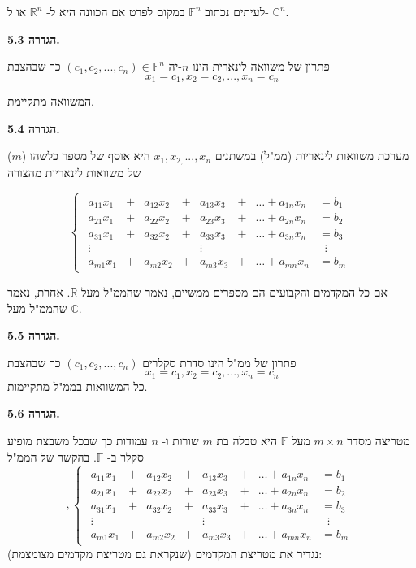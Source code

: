 \documentclass[12pt]{report}
\theoremstyle{plain}
\theoremstyle{definition}
\newcommand{\R}{\mathbb{R}}
\newcommand{\C}{\mathbb{C}}
\newcommand{\F}{\mathbb{F}}
\newcommand{\0}{\mathbf{0}}
\begin{document}
לעיתים נכתוב
$\F^n$
במקום לפרט אם הכוונה היא ל-
$\R^n$
או ל-
$\C^n$.
\bigskip
\bigskip

\noindent\textbf{הגדרה 5.3.}

פתרון של משוואה לינארית הינו $n$-יה $(c_1,c_2,...,c_n)\in\F^{n}$
כך שבהצבת
$$
x_1=c_1,x_2=c_2,...,x_n=c_n
$$

המשוואה מתקיימת.
\bigskip
\bigskip

\noindent\textbf{הגדרה 5.4.}

מערכת משוואות לינאריות (ממ"ל) במשתנים
$x_1,x_{2,}...,x_n$
היא אוסף של מספר כלשהו ($m$) של משוואות לינאריות מהצורה

\begin{equation*}
\begin{cases}
\begin{alignedat}{7}
a_{11}x_1 &{}+{}& a_{12}x_2 &{}+{}& a_{13}x_3 &{}+{}& \dots + a_{1n}x_n &= b_1 \\[4pt]
a_{21}x_1 &{}+{}& a_{22}x_2 &{}+{}& a_{23}x_3 &{}+{}& \dots + a_{2n}x_n &= b_2 \\[4pt]
a_{31}x_1 &{}+{}& a_{32}x_2 &{}+{}& a_{33}x_3 &{}+{}& \dots + a_{3n}x_n &= b_3 \\[4pt]
\vdots& & & & \vdots & & & \;\;\vdots \\[4pt]
a_{m1}x_1 &{}+{}& a_{m2}x_2 &{}+{}& a_{m3}x_3 &{}+{}& \dots + a_{mn}x_n &= b_m
\end{alignedat}
\end{cases}
\end{equation*}

אם כל המקדמים והקבועים הם מספרים ממשיים,
נאמר שהממ"ל
מעל $\R$.
אחרת, נאמר שהממ"ל מעל
$\C$.
\bigskip
\bigskip

\noindent\textbf{הגדרה 5.5.}

פתרון של ממ"ל הינו סדרת סקלרים
$(c_1,c_2,...,c_n)$
כך שבהצבת 
$$
x_1=c_1,x_2=c_2,...,x_n=c_n
$$
\underline{כל}
המשוואות בממ"ל מתקיימות.
\bigskip
\bigskip

\noindent\textbf{הגדרה 5.6.}

מטריצה מסדר
$m\times n$
מעל
$\F$
היא טבלה בת
$m$
שורות ו-
$n$
עמודות כך שבכל משבצת מופיע סקלר ב-
$\F$.
בהקשר של הממ"ל
\begin{equation*}
,\begin{cases}
\begin{alignedat}{7}
a_{11}x_1 &{}+{}& a_{12}x_2 &{}+{}& a_{13}x_3 &{}+{}& \dots + a_{1n}x_n &= b_1 \\[4pt]
a_{21}x_1 &{}+{}& a_{22}x_2 &{}+{}& a_{23}x_3 &{}+{}& \dots + a_{2n}x_n &= b_2 \\[4pt]
a_{31}x_1 &{}+{}& a_{32}x_2 &{}+{}& a_{33}x_3 &{}+{}& \dots + a_{3n}x_n &= b_3 \\[4pt]
\vdots& & & & \vdots & & & \;\;\vdots \\[4pt]
a_{m1}x_1 &{}+{}& a_{m2}x_2 &{}+{}& a_{m3}x_3 &{}+{}& \dots + a_{mn}x_n &= b_m
\end{alignedat}
\end{cases}
\end{equation*}
נגדיר את מטריצת המקדמים (שנקראת גם מטריצת מקדמים מצומצמת):
\end{document}
